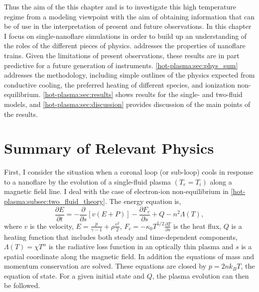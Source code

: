 Thus the aim of the this chapter and \citet[ hereafter]{barnes_inference_2016-1} is to investigate this high temperature regime from a modeling viewpoint with the aim of obtaining information that can be of use in the interpretation of present and future observations. In this chapter I focus on single-nanoflare simulations in order to build up an understanding of the roles of the different pieces of physics.  addresses the properties of nanoflare trains. Given the limitations of present observations, these results are in part predictive for a future generation of instruments. \autoref{hot-plasma:sec:phys_sum} addresses the methodology, including simple outlines of the physics expected from conductive cooling, the preferred heating of different species, and ionization non-equilibrium. \autoref{hot-plasma:sec:results} shows results for the single- and two-fluid models, and \autoref{hot-plasma:sec:discussion} provides discussion of the main points of the results.

\section{Summary of Relevant Physics}\label{hot-plasma:sec:phys_sum}

First, I consider the situation when a coronal loop (or sub-loop) cools in response to a nanoflare by the evolution of a single-fluid plasma $(T_e = T_i)$ along a magnetic field line. I deal with the case of electron-ion non-equilibrium in  \autoref{hot-plasma:subsec:two_fluid_theory}. The energy equation is,
\begin{equation}\label{hot-plasma:eq:energy_1d}
    \frac{\partial E}{\partial t} = -\frac{\partial}{\partial s}[v(E+P)] - \frac{\partial F_c}{\partial s} + Q - n^2\Lambda(T),
\end{equation}
where $v$ is the velocity, $E=\frac{p}{\gamma -1} + \rho\frac{v^2}{2}$, $F_c=-\kappa_0 T^{5/2}\frac{\partial T}{\partial s}$ is the heat flux, $Q$ is a heating function that includes both steady and time-dependent components, $\Lambda(T)=\chi T^{\alpha}$ is the radiative loss function in an optically thin plasma \citep[e.g.][]{klimchuk_highly_2008} and $s$ is a spatial coordinate along the magnetic field. In addition the equations of mass and momentum conservation are solved. These equations are closed by $p=2nk_BT$, the equation of state. For a given initial state and $Q$, the plasma evolution can then be followed.

